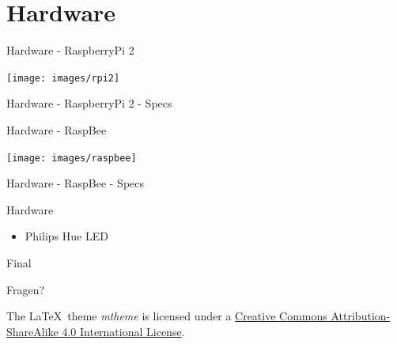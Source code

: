 \documentclass[10pt, compress]{beamer}
\begin{document}
\section{Hardware}

\begin{frame}{Hardware - RaspberryPi 2}
  \begin{center}
    \texttt{[image: images/rpi2]}
  \end{center}
\end{frame}

\begin{frame}{Hardware - RaspberryPi 2 - Specs}
\end{frame}

\begin{frame}{Hardware - RaspBee}
  \begin{center}
    \texttt{[image: images/raspbee]}
  \end{center}
\end{frame}

\begin{frame}{Hardware - RaspBee - Specs}
\end{frame}

\begin{frame}{Hardware}
  \begin{itemize}
	\item Philips Hue LED
  \end{itemize}
\end{frame}

\begin{frame}{Final}

  \begin{center}\huge Fragen?\end{center}
    
  \vspace{1cm}
  \begin{center}
  {\small

  The \LaTeX \ theme \emph{mtheme} is licensed under a
  \href{http://creativecommons.org/licenses/by-sa/4.0/}{Creative Commons
  Attribution-ShareAlike 4.0 International License}.}

  \ccbysa
  
  \end{center}

\end{frame}
\end{document}
